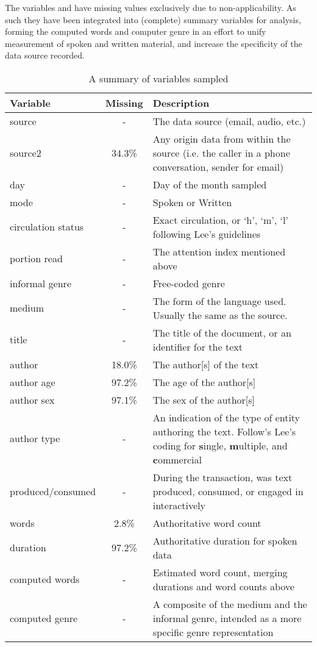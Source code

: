 The variables  and  have missing values exclusively due to non-applicability.  As such they have been integrated into (complete) summary variables for analysis, forming the computed words and computer genre in an effort to unify measurement of spoken and written material, and increase the specificity of the data source recorded.


\begin{table}[hp]
\centering
    \begin{tabular}{ | l | c | p{7cm} |}
    \hline
    \textbf{Variable} & \textbf{Missing} & \textbf{Description} \\ \hline
   
    source              & - & The data source (email, audio, etc.) \\ \hline
    source2             & 34.3\% & Any origin data from within the source (i.e. the caller in a phone conversation, sender for email) \\ \hline
    day                 & - & Day of the month sampled \\ \hline
    mode                & - & Spoken or Written \\ \hline
    circulation status  & - & Exact circulation, or `h', `m', `l' following Lee's guidelines\\ \hline
    portion read        & - & The attention index mentioned above \\ \hline
    informal genre      & - & Free-coded genre \\ \hline
    medium              & - & The form of the language used.  Usually the same as the source. \\ \hline
    title               & - & The title of the document, or an identifier for the text \\ \hline
    author              & 18.0\% & The author[s] of the text\\ \hline
    author age          & 97.2\% & The age of the author[s] \\ \hline
    author sex          & 97.1\% & The sex of the author[s] \\ \hline
    author type         & - & An indication of the type of entity authoring the text.  Follow's Lee's coding for \textbf{s}ingle, \textbf{m}ultiple, and \textbf{c}ommercial\\ \hline
    produced/consumed   & - & During the transaction, was text produced, consumed, or engaged in interactively \\ \hline 
    words               & 2.8\% & Authoritative word count\\ \hline
    duration            & 97.2\% & Authoritative duration for spoken data\\ \hline
    computed words      & - & Estimated word count, merging durations and word counts above\\ \hline
    computed genre      & - & A composite of the medium and the informal genre, intended as a more specific genre representation \\
    \hline
    \end{tabular}
\caption{A summary of variables sampled}
\label{table:personal:variables}
\end{table}
